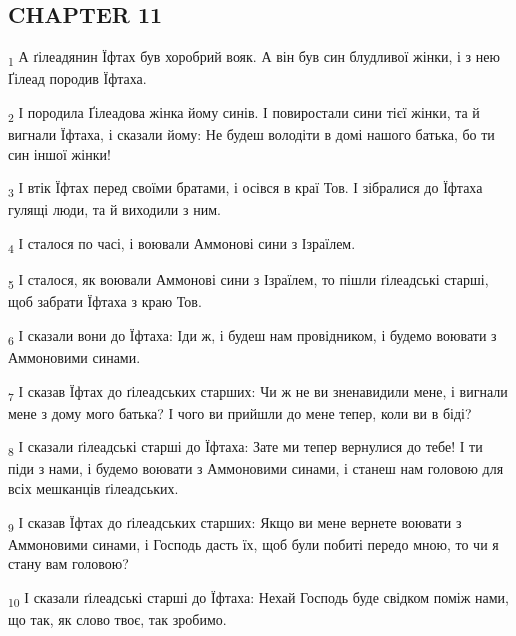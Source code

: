 \subsection{CHAPTER 11}
\begin{tcolorbox}
\textsubscript{1} А ґілеадянин Їфтах був хоробрий вояк. А він був син блудливої жінки, і з нею Ґілеад породив Їфтаха.
\end{tcolorbox}
\begin{tcolorbox}
\textsubscript{2} І породила Ґілеадова жінка йому синів. І повиростали сини тієї жінки, та й вигнали Їфтаха, і сказали йому: Не будеш володіти в домі нашого батька, бо ти син іншої жінки!
\end{tcolorbox}
\begin{tcolorbox}
\textsubscript{3} І втік Їфтах перед своїми братами, і осівся в краї Тов. І зібралися до Їфтаха гулящі люди, та й виходили з ним.
\end{tcolorbox}
\begin{tcolorbox}
\textsubscript{4} І сталося по часі, і воювали Аммонові сини з Ізраїлем.
\end{tcolorbox}
\begin{tcolorbox}
\textsubscript{5} І сталося, як воювали Аммонові сини з Ізраїлем, то пішли ґілеадські старші, щоб забрати Їфтаха з краю Тов.
\end{tcolorbox}
\begin{tcolorbox}
\textsubscript{6} І сказали вони до Їфтаха: Іди ж, і будеш нам провідником, і будемо воювати з Аммоновими синами.
\end{tcolorbox}
\begin{tcolorbox}
\textsubscript{7} І сказав Їфтах до ґілеадських старших: Чи ж не ви зненавидили мене, і вигнали мене з дому мого батька? І чого ви прийшли до мене тепер, коли ви в біді?
\end{tcolorbox}
\begin{tcolorbox}
\textsubscript{8} І сказали ґілеадські старші до Їфтаха: Зате ми тепер вернулися до тебе! І ти піди з нами, і будемо воювати з Аммоновими синами, і станеш нам головою для всіх мешканців ґілеадських.
\end{tcolorbox}
\begin{tcolorbox}
\textsubscript{9} І сказав Їфтах до ґілеадських старших: Якщо ви мене вернете воювати з Аммоновими синами, і Господь дасть їх, щоб були побиті передо мною, то чи я стану вам головою?
\end{tcolorbox}
\begin{tcolorbox}
\textsubscript{10} І сказали ґілеадські старші до Їфтаха: Нехай Господь буде свідком поміж нами, що так, як слово твоє, так зробимо.
\end{tcolorbox}
